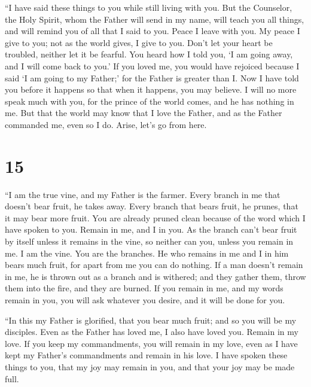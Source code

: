 ``I have said these things to you while still living with
you.  But the Counselor, the Holy Spirit, whom the Father
will send in my name, will teach you all things, and will remind you of
all that I said to you.  Peace I leave with you. My peace I
give to you; not as the world gives, I give to you. Don't let your heart
be troubled, neither let it be fearful.  You heard how I
told you, `I am going away, and I will come back to you.' If you loved
me, you would have rejoiced because I said `I am going to my Father;'
for the Father is greater than I.  Now I have told you
before it happens so that when it happens, you may believe.
 I will no more speak much with you, for the prince of the
world comes, and he has nothing in me.  But that the world
may know that I love the Father, and as the Father commanded me, even so
I do. Arise, let's go from here.

\hypertarget{section-14}{%
\section{15}\label{section-14}}

 ``I am the true vine, and my Father is the farmer.
 Every branch in me that doesn't bear fruit, he takes away.
Every branch that bears fruit, he prunes, that it may bear more fruit.
 You are already pruned clean because of the word which I
have spoken to you.  Remain in me, and I in you. As the
branch can't bear fruit by itself unless it remains in the vine, so
neither can you, unless you remain in me.  I am the vine.
You are the branches. He who remains in me and I in him bears much
fruit, for apart from me you can do nothing.  If a man
doesn't remain in me, he is thrown out as a branch and is withered; and
they gather them, throw them into the fire, and they are burned.
 If you remain in me, and my words remain in you, you will
ask whatever you desire, and it will be done for you.

 ``In this my Father is glorified, that you bear much fruit;
and so you will be my disciples.  Even as the Father has
loved me, I also have loved you. Remain in my love.  If you
keep my commandments, you will remain in my love, even as I have kept my
Father's commandments and remain in his love.  I have
spoken these things to you, that my joy may remain in you, and that your
joy may be made full.


